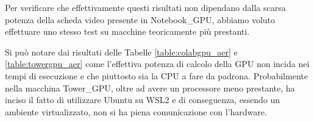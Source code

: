 Per verificare che effettivamente questi risultati non dipendano dalla scarsa potenza della scheda video presente in Notebook\_GPU, abbiamo voluto effettuare uno stesso test su macchine teoricamente più prestanti.
\begin{table}[htp]
    \begin{subtable}[h]{0.45\textwidth}
        \centering
       \caption{}
       \label{table:colabgpu_aer}
    \end{subtable}
    \hfill
    \begin{subtable}[h]{0.45\textwidth}
        \centering
        \caption{}
        \label{table:towergpu_aer}
     \end{subtable}
     \caption[Risultati quinta simulazione.]{Nella colonna di destra sono riportati i tempi di esecuzione.}
\end{table}
\newline

Si può notare dai risultati delle Tabelle \ref{table:colabgpu_aer} e \ref{table:towergpu_aer} come l'effettiva potenza di calcolo della GPU non incida nei tempi di esecuzione e che piuttosto sia la CPU a fare da padrona.
Probabilmente nella macchina Tower\_GPU, oltre ad avere un processore meno prestante, ha inciso il fatto di utilizzare Ubuntu su WSL2 e di conseguenza, essendo un ambiente virtualizzato, non si ha piena comunicazione con l'hardware.

